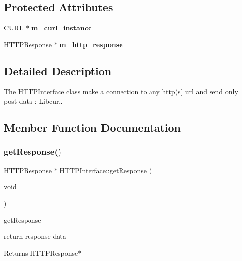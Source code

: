 \subsection*{Protected Attributes}
\begin{DoxyCompactItemize}
\item 
\mbox{\label{classAuth_1_1HTTPInterface_a33db32facfdc78bed06a8e78ecd9459e}} 
C\+U\+RL $\ast$ {\bfseries m\+\_\+curl\+\_\+instance}
\item 
\mbox{\label{classAuth_1_1HTTPInterface_a8f4f3bcd25596b8b7eff4ecda764a82a}} 
\hyperlink{classAuth_1_1HTTPResponse}{H\+T\+T\+P\+Response} $\ast$ {\bfseries m\+\_\+http\+\_\+response}
\end{DoxyCompactItemize}


\subsection{Detailed Description}
The \hyperlink{classAuth_1_1HTTPInterface}{H\+T\+T\+P\+Interface} class make a connection to any http(s) url and send only post data \+: Libcurl. 

\subsection{Member Function Documentation}
\mbox{\label{classAuth_1_1HTTPInterface_a02099413f03853c33303d1d490ceb288}} 
\subsubsection{\texorpdfstring{get\+Response()}{getResponse()}}
{\footnotesize\ttfamily \hyperlink{classAuth_1_1HTTPResponse}{H\+T\+T\+P\+Response} $\ast$ H\+T\+T\+P\+Interface\+::get\+Response (\begin{DoxyParamCaption}\item[{void}]{ }\end{DoxyParamCaption})}



get\+Response 

return response data \begin{DoxyReturn}{Returns}
H\+T\+T\+P\+Response$\ast$ 
\end{DoxyReturn}
\mbox{\label{classAuth_1_1HTTPInterface_acb184003ca339f704cfe1fbb2e1dd7de}} 
